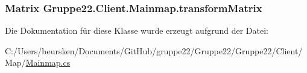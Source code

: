 \hypertarget{class_gruppe22_1_1_client_1_1_mainmap_a1fcf58729b476ec0b4e3ccb8bb2ba642}{
\subsubsection[{transform\-Matrix}]{\setlength{\rightskip}{0pt plus 5cm}Matrix Gruppe22.\-Client.\-Mainmap.\-transform\-Matrix\hspace{0.3cm}{\ttfamily [get]}}}\label{class_gruppe22_1_1_client_1_1_mainmap_a1fcf58729b476ec0b4e3ccb8bb2ba642}


Die Dokumentation für diese Klasse wurde erzeugt aufgrund der Datei\-:\begin{DoxyCompactItemize}
\item 
C\-:/\-Users/beursken/\-Documents/\-Git\-Hub/gruppe22/\-Gruppe22/\-Gruppe22/\-Client/\-Map/\hyperlink{_mainmap_8cs}{Mainmap.\-cs}\end{DoxyCompactItemize}
